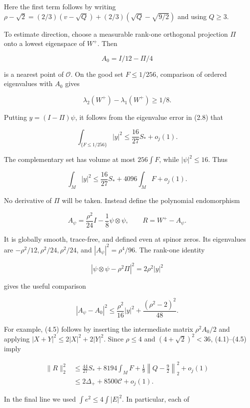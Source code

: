 \documentclass[
  10pt,
]{article}
\begin{document}
Here the first term follows by writing
\(\rho-\sqrt2=(2/3)(v-\sqrt Q)+(2/3)(\sqrt Q-\sqrt{9/2})\) and using
\(Q\ge3\).

To estimate direction, choose a measurable rank-one orthogonal
projection \(\Pi\) onto a lowest eigenspace of \(W^+\). Then

\[
                  A_0=I/12-\Pi/4
\]

is a nearest point of \(\mathcal O\). On the good set \(F\le1/256\),
comparison of ordered eigenvalues with \(A_0\) gives

\[
                   \lambda_2(W^+)-\lambda_1(W^+)\ge1/8.
\]

Putting \(y=(I-\Pi)\psi\), it follows from the eigenvalue error in (2.8)
that

\[
 \int_{\{F\le1/256\}}|y|^2\le\frac{16}{27}S_*+o_j(1).
\]

The complementary set has volume at most \(256\int F\), while
\(|\psi|^2\le16\). Thus

\[
                 \int_M|y|^2\le\frac{16}{27}S_*+4096\int_MF+o_j(1).
 \tag{4.3}
\]

No derivative of \(\Pi\) will be taken. Instead define the polynomial
endomorphism

\[
       A_\psi=\frac{\rho^2}{24}I-\frac18\psi\otimes\psi,
             \qquad R=W^+-A_\psi.                       \tag{4.4}
\]

It is globally smooth, trace-free, and defined even at spinor zeros. Its
eigenvalues are \(-\rho^2/12,\rho^2/24,\rho^2/24\), and
\(|A_\psi|^2=\rho^4/96\). The rank-one identity

\[
 |\psi\otimes\psi-\rho^2\Pi|^2=2\rho^2|y|^2
\]

gives the useful comparison

\[
 |A_\psi-A_0|^2
       \le\frac{\rho^2}{16}|y|^2+\frac{(\rho^2-2)^2}{48}.
 \tag{4.5}
\]

For example, (4.5) follows by inserting the intermediate matrix
\(\rho^2 A_0/2\) and applying \(|X+Y|^2\le2|X|^2+2|Y|^2\). Since
\(\rho\le4\) and \((4+\sqrt2)^2<36\), (4.1)--(4.5) imply

\[
 \begin{aligned}
 \|R\|_2^2
 &\le\frac{44}{27}S_*+8194\int_MF
                     +\frac19\left\|Q-\frac92\right\|_2^2+o_j(1)\\
 &\le2\Delta_++8500\mathcal C+o_j(1).
 \end{aligned}                                              \tag{4.6}
\]

In the final line we used \(\int e^2\le4\int|E|^2\). In particular, each
of
\end{document}
